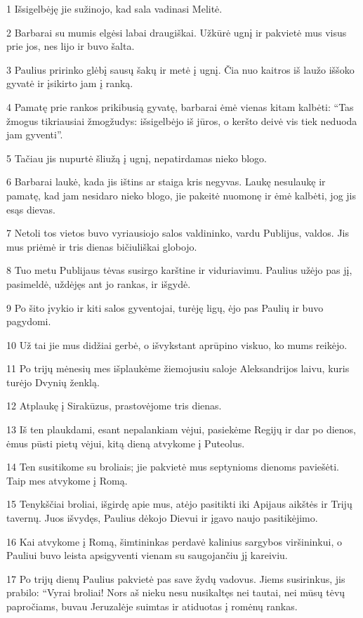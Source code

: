\par 1 Išsigelbėję jie sužinojo, kad sala vadinasi Melitė. 
\par 2 Barbarai su mumis elgėsi labai draugiškai. Užkūrė ugnį ir pakvietė mus visus prie jos, nes lijo ir buvo šalta. 
\par 3 Paulius pririnko glėbį sausų šakų ir metė į ugnį. Čia nuo kaitros iš laužo iššoko gyvatė ir įsikirto jam į ranką. 
\par 4 Pamatę prie rankos prikibusią gyvatę, barbarai ėmė vienas kitam kalbėti: “Tas žmogus tikriausiai žmogžudys: išsigelbėjo iš jūros, o keršto deivė vis tiek neduoda jam gyventi”. 
\par 5 Tačiau jis nupurtė šliužą į ugnį, nepatirdamas nieko blogo. 
\par 6 Barbarai laukė, kada jis ištins ar staiga kris negyvas. Laukę nesulaukę ir pamatę, kad jam nesidaro nieko blogo, jie pakeitė nuomonę ir ėmė kalbėti, jog jis esąs dievas. 
\par 7 Netoli tos vietos buvo vyriausiojo salos valdininko, vardu Publijus, valdos. Jis mus priėmė ir tris dienas bičiuliškai globojo. 
\par 8 Tuo metu Publijaus tėvas susirgo karštine ir viduriavimu. Paulius užėjo pas jį, pasimeldė, uždėjęs ant jo rankas, ir išgydė. 
\par 9 Po šito įvykio ir kiti salos gyventojai, turėję ligų, ėjo pas Paulių ir buvo pagydomi. 
\par 10 Už tai jie mus didžiai gerbė, o išvykstant aprūpino viskuo, ko mums reikėjo. 
\par 11 Po trijų mėnesių mes išplaukėme žiemojusiu saloje Aleksandrijos laivu, kuris turėjo Dvynių ženklą. 
\par 12 Atplaukę į Sirakūzus, prastovėjome tris dienas. 
\par 13 Iš ten plaukdami, esant nepalankiam vėjui, pasiekėme Regijų ir dar po dienos, ėmus pūsti pietų vėjui, kitą dieną atvykome į Puteolus. 
\par 14 Ten susitikome su broliais; jie pakvietė mus septynioms dienoms paviešėti. Taip mes atvykome į Romą. 
\par 15 Tenykščiai broliai, išgirdę apie mus, atėjo pasitikti iki Apijaus aikštės ir Trijų tavernų. Juos išvydęs, Paulius dėkojo Dievui ir įgavo naujo pasitikėjimo. 
\par 16 Kai atvykome į Romą, šimtininkas perdavė kalinius sargybos viršininkui, o Pauliui buvo leista apsigyventi vienam su saugojančiu jį kareiviu. 
\par 17 Po trijų dienų Paulius pakvietė pas save žydų vadovus. Jiems susirinkus, jis prabilo: “Vyrai broliai! Nors aš nieku nesu nusikaltęs nei tautai, nei mūsų tėvų papročiams, buvau Jeruzalėje suimtas ir atiduotas į romėnų rankas. 
